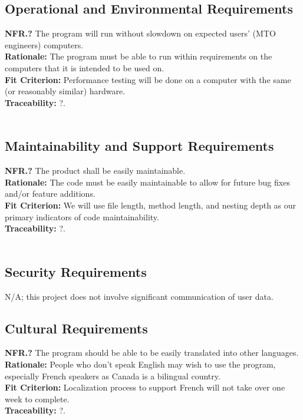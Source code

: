 \documentclass[12pt]{article}
\begin{document}
\subsection{Operational and Environmental Requirements}

  \textbf{NFR.?} The program will run without slowdown on expected users' (MTO engineers) computers.\\
  \textbf{Rationale:} The program must be able to run within requirements on the computers that it is intended to be used on.\\
  \textbf{Fit Criterion:} Performance testing will be done on a computer with the same (or reasonably similar) hardware.\\
  \textbf{Traceability:} ?.\\\\

\subsection{Maintainability and Support Requirements}

  \textbf{NFR.?} The product shall be easily maintainable.\\
  \textbf{Rationale:} The code must be easily maintainable to allow for future bug fixes and/or feature additions.\\
  \textbf{Fit Criterion:} We will use file length, method length, and nesting depth as our primary indicators of code maintainability.\\
  \textbf{Traceability:} ?.\\\\

\subsection{Security Requirements}

N/A; this project does not involve significant communication of user data.\\

\subsection{Cultural Requirements}

  \textbf{NFR.?} The program should be able to be easily translated into other languages.\\
  \textbf{Rationale:} People who don't speak English may wish to use the program, especially French speakers as Canada is a bilingual country.\\
  \textbf{Fit Criterion:} Localization process to support French will not take over one week to complete.\\
  \textbf{Traceability:} ?.\\\\
\end{document}
